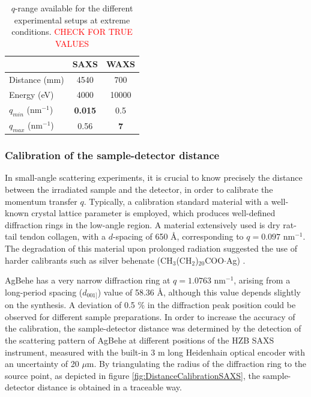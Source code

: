 \begin{table}[]
\centering
\caption{$q$-range available for the different experimental setups at extreme conditions. \textcolor{red}{CHECK FOR TRUE VALUES}}
\label{tab:qrange}
\begin{tabular}{|l|c|c|}
\hline
              & \textbf{SAXS} & \textbf{WAXS} \\ \hline
Distance (mm) & 4540          & 700           \\ \hline
Energy (eV)   & 4000          & 10000         \\ \hline
$q_{min}$ (nm$^{-1}$)   & \textbf{0.015}         & 0.5           \\ \hline
$q_{max}$ (nm$^{-1}$)   & 0.56             & \textbf{7}             \\ \hline
\end{tabular}
\end{table}

\subsubsection{Calibration of the sample-detector distance}

In small-angle scattering experiments, it is crucial to know precisely the distance between the irradiated sample and the detector, in order to calibrate the momentum transfer $q$. Typically, a calibration standard material with a well-known crystal lattice parameter is employed, which produces well-defined diffraction rings in the low-angle region. A material extensively used is dry rat-tail tendon collagen, with a $d$-spacing of 650 \AA \citep{amenitsch_performance_1997}, corresponding to $q=0.097$ nm$^{-1}$. The degradation of this material upon prolonged radiation suggested the use of harder calibrants such as silver behenate (CH$_3$(CH$_2$)$_{20}$COO$\cdot$Ag) \citep{huang_x-ray_1993}.

AgBehe has a very narrow diffraction ring at $q=1.0763$ nm$^{-1}$, arising from a long-period spacing ($d_{001]}$) value of 58.36 \AA \citep{blanton_jcpdsinternational_1995}, although this value depends slightly on the synthesis. A deviation of 0.5 $\%$ in the diffraction peak position could be observed for different sample preparations. In order to increase the accuracy of the calibration, the sample-detector distance was determined by the detection of the scattering pattern of AgBehe at different positions of the HZB SAXS instrument, measured with the built-in 3 m long Heidenhain optical encoder with an uncertainty of 20 $\mu$m. By triangulating the radius of the diffraction ring to the source point, as depicted in figure \ref{fig:DistanceCalibrationSAXS}, the sample-detector distance is obtained in a traceable way.

